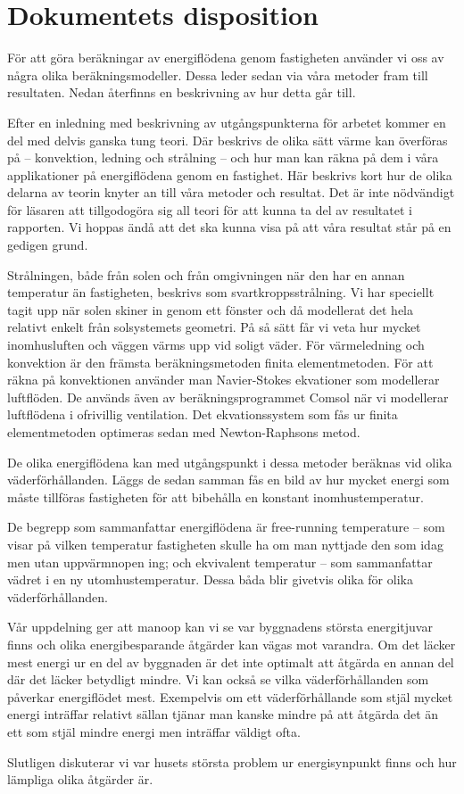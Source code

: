 \section{Dokumentets disposition}

För att göra beräkningar av energiflödena genom fastigheten använder vi oss av några olika beräkningsmodeller. Dessa leder sedan via våra metoder fram till resultaten. Nedan återfinns en beskrivning av hur detta går till.

Efter en inledning med beskrivning av utgångspunkterna för arbetet kommer en del med delvis ganska tung teori. Där beskrivs de olika sätt värme kan överföras på – konvektion, ledning och strålning – och hur man kan räkna på dem i våra applikationer på energiflödena genom en fastighet. Här beskrivs kort hur de olika delarna av teorin knyter an till våra metoder och resultat. Det är inte nödvändigt för läsaren att tillgodogöra sig all teori för att kunna ta del av resultatet i rapporten. Vi hoppas ändå att det ska kunna visa på att våra resultat står på en gedigen grund.

Strålningen, både från solen och från omgivningen när den har en annan temperatur än fastigheten, beskrivs som 
svartkroppsstrålning. Vi har speciellt tagit upp när solen skiner in genom ett fönster och då 
modellerat det hela relativt enkelt från solsystemets geometri. På så sätt får vi veta hur 
mycket inomhusluften och väggen värms upp vid soligt väder.
För värmeledning och konvektion är den främsta beräkningsmetoden finita 
elementmetoden. För att räkna på konvektionen använder man Navier-Stokes ekvationer 
som modellerar luftflöden. De används även av beräkningsprogrammet Comsol när vi 
modellerar luftflödena i ofrivillig ventilation. Det ekvationssystem som fås ur finita
 elementmetoden optimeras sedan med Newton-Raphsons metod.

De olika energiflödena kan med utgångspunkt i dessa metoder beräknas vid olika väderförhållanden. Läggs de 
sedan samman fås en bild av hur mycket energi som måste tillföras fastigheten för att 
bibehålla en konstant inomhustemperatur.

De begrepp som sammanfattar energiflödena är free-running temperature – som visar på 
vilken temperatur fastigheten skulle ha om man nyttjade den som idag men utan 
uppvärmnopen ing; och ekvivalent temperatur – som sammanfattar vädret i en ny utomhustemperatur. Dessa båda blir givetvis olika för olika väderförhållanden.

Vår uppdelning ger att manoop kan vi se var byggnadens största energitjuvar finns och 
olika energibesparande åtgärder kan vägas mot varandra. Om det läcker mest energi ur en del av byggnaden är det inte optimalt att åtgärda en annan del där det läcker betydligt mindre. Vi kan också se vilka väderförhållanden som påverkar energiflödet mest. Exempelvis om ett väderförhållande som stjäl mycket energi inträffar relativt sällan tjänar man kanske mindre på att åtgärda det än ett som stjäl mindre energi men inträffar väldigt ofta.

Slutligen diskuterar vi var husets största problem ur energisynpunkt finns och hur lämpliga olika åtgärder är.
